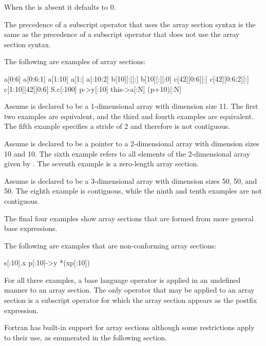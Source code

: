 \begin{ccppspecific}
When the  is absent it defaults to 0.

The precedence of a subscript operator that uses the array section syntax is
the same as the precedence of a subscript operator that does not use the
array section syntax.

\begin{note}
The following are examples of array sections:

\begin{indentedcodelist}
a[0:6]
a[0:6:1]
a[1:10]
a[1:]
a[:10:2]
b[10][:][:]
b[10][:][:0]
c[42][0:6][:]
c[42][0:6:2][:]
c[1:10][42][0:6]
S.c[:100]
p->y[:10]
this->a[:N]
(p+10)[:N]
\end{indentedcodelist}

Assume  is declared to be a 1-dimensional array with dimension size
11.  The first two examples are equivalent, and the third and fourth
examples are equivalent. The fifth example specifies a stride of 2 and
therefore is not contiguous.

Assume  is declared to be a pointer to a 2-dimensional array with
dimension sizes 10 and 10. The sixth example refers to all elements of the
2-dimensional array given by . The seventh
example is a zero-length array section.

Assume  is declared to be a 3-dimensional array with dimension sizes
50, 50, and 50.  The eighth example is contiguous, while the ninth and
tenth examples are not contiguous.

The final four examples show array sections that are formed from
more general base expressions.

The following are examples that are non-conforming array sections:

\begin{indentedcodelist}
s[:10].x
p[:10]->y
*(xp[:10])
\end{indentedcodelist}

For all three examples, a base language operator is applied in an undefined
manner to an array section. The only operator that may be applied to an array
section is a subscript operator for which the array section appears as the
postfix expression.
\end{note}
\end{ccppspecific}

\begin{fortranspecific}
Fortran has built-in support for array sections although some
restrictions apply to their use, as enumerated in the following section.
\end{fortranspecific}

